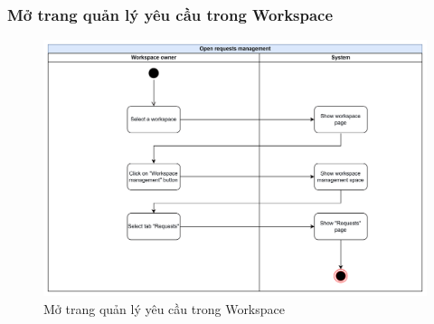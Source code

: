\subsubsection{Mở trang quản lý yêu cầu trong Workspace}
    \begin{figure}[H]
        \centering
        \includegraphics[width=\linewidth]{Content/Phân tích và thiết kế hệ thống/documents/Sơ đồ hoạt động/images/openRequestsManagement.png}
        \vspace{0.5cm}
        \caption{Mở trang quản lý yêu cầu trong Workspace}
        \label{fig:Mở trang quản lý yêu cầu trong Workspace}
    \end{figure}